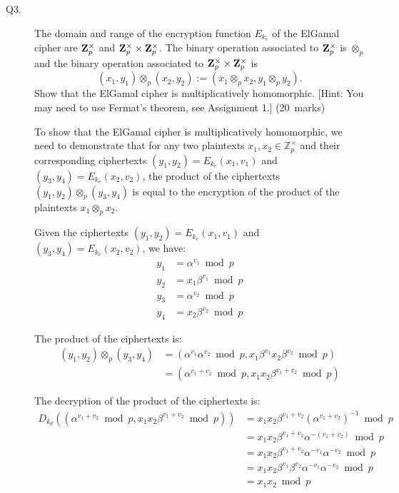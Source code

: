 \documentclass[11pt,epsfig]{article}
\newcommand{\bZ}{{\bf Z}}
\begin{document}
\begin{description}
\item[Q3.] 
The domain and range of the encryption function $E_{k_e}$  of the ElGamal cipher are $\bZ_p^\times$ and 
$\bZ_p^\times \times \bZ_p^\times$.  
The binary operation associated to $\bZ_p^\times$ is $\otimes_p$ and the binary operation associated to 
 $\bZ_p^\times \times \bZ_p^\times$ is 
 $$
 (x_1, y_1) \otimes_p (x_2, y_2) := (x_1 \otimes_p x_2, y_1 \otimes_p y_2).  
 $$
Show that the ElGamal cipher is multiplicatively homomorphic.   [Hint: You may need to use Fermat's theorem, see Assignment 1.] \hfill (20~marks)  

 To show that the ElGamal cipher is multiplicatively homomorphic, we need to demonstrate that for any two plaintexts $x_1, x_2 \in \mathbb{Z}_p^\times$ and their corresponding ciphertexts $(y_1, y_2) = E_{k_e}(x_1, v_1)$ and $(y_3, y_4) = E_{k_e}(x_2, v_2)$, the product of the ciphertexts $(y_1, y_2) \otimes_p (y_3, y_4)$ is equal to the encryption of the product of the plaintexts $x_1 \otimes_p x_2$.

Given the ciphertexts $(y_1, y_2) = E_{k_e}(x_1, v_1)$ and $(y_3, y_4) = E_{k_e}(x_2, v_2)$, we have:
\begin{align}
y_1 &= \alpha^{v_1} \bmod{p}\\
y_2 &= x_1 \beta^{v_1} \bmod{p}\\
y_3 &= \alpha^{v_2} \bmod{p}\\
y_4 &= x_2 \beta^{v_2} \bmod{p}
\end{align}

The product of the ciphertexts is:
\begin{align}
(y_1, y_2) \otimes_p (y_3, y_4) &= (\alpha^{v_1} \alpha^{v_2} \bmod{p}, x_1 \beta^{v_1} x_2 \beta^{v_2} \bmod{p})\\
&= (\alpha^{v_1 + v_2} \bmod{p}, x_1 x_2 \beta^{v_1 + v_2} \bmod{p})
\end{align}

The decryption of the product of the ciphertexts is:
\begin{align}
D_{k_d}((\alpha^{v_1 + v_2} \bmod{p}, x_1 x_2 \beta^{v_1 + v_2} \bmod{p})) &= x_1 x_2 \beta^{v_1 + v_2} \left(\alpha^{v_1 + v_2}\right)^{-1} \bmod{p}\\
&= x_1 x_2 \beta^{v_1 + v_2} \alpha^{-(v_1 + v_2)} \bmod{p}\\
&= x_1 x_2 \beta^{v_1 + v_2} \alpha^{-v_1} \alpha^{-v_2} \bmod{p}\\
&= x_1 x_2 \beta^{v_1} \beta^{v_2} \alpha^{-v_1} \alpha^{-v_2} \bmod{p}\\
&= x_1 x_2 \bmod{p}
\end{align}


\end{description}
\end{document}
